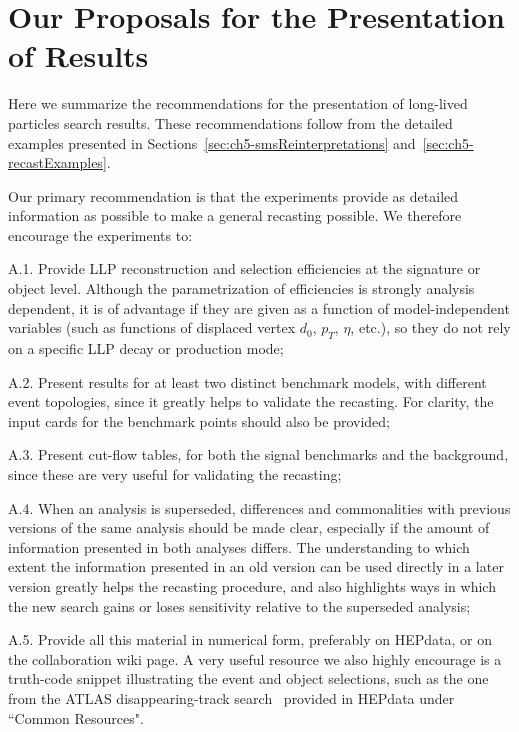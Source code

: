 \section{Our Proposals for the Presentation of Results}
\label{sec:ch5-rec_summary}

Here we summarize the recommendations for the presentation of long-lived
particles search results. These recommendations follow from the detailed
examples presented in Sections~\ref{sec:ch5-smsReinterpretations}
and~\ref{sec:ch5-recastExamples}.

Our primary recommendation is that the experiments provide as detailed
information as possible to make a general recasting possible.
We therefore encourage the experiments to:
\begin{description*}
  \item[A.1.] Provide LLP reconstruction and selection efficiencies at the signature or object level. Although the parametrization of efficiencies is strongly analysis dependent, it is of advantage if they are given as a function of model-independent variables (such as functions of displaced vertex $d_0$, $p_T$, $\eta$, etc.), so
  they do not rely on a specific LLP decay or production mode;
  \item[A.2.] Present results for at least two distinct benchmark
  models, with different event topologies, since it greatly helps to validate the recasting. For clarity, the input cards for the benchmark points should also be provided;
  \item[A.3.] Present cut-flow tables, for both the signal
    benchmarks and the background, since these are  very useful for
    validating the recasting;
  \item[A.4.]  When an analysis is superseded, differences and commonalities with previous versions of the same analysis should be made clear, especially if the amount of information presented in both analyses differs. The understanding to which extent
   the information presented in an old version can be used directly in a later version greatly
   helps the recasting procedure, and also highlights ways in which the new search gains or loses sensitivity relative to the superseded analysis;
  \item[A.5.] Provide all this material in numerical form, preferably on HEPdata, or on the collaboration wiki page. A very useful resource we also highly encourage is a truth-code snippet illustrating the event and object selections, such as the one from the ATLAS disappearing-track
  search~\cite{Aaboud:2017mpt} provided in HEPdata under ``Common Resources".
\end{description*}

